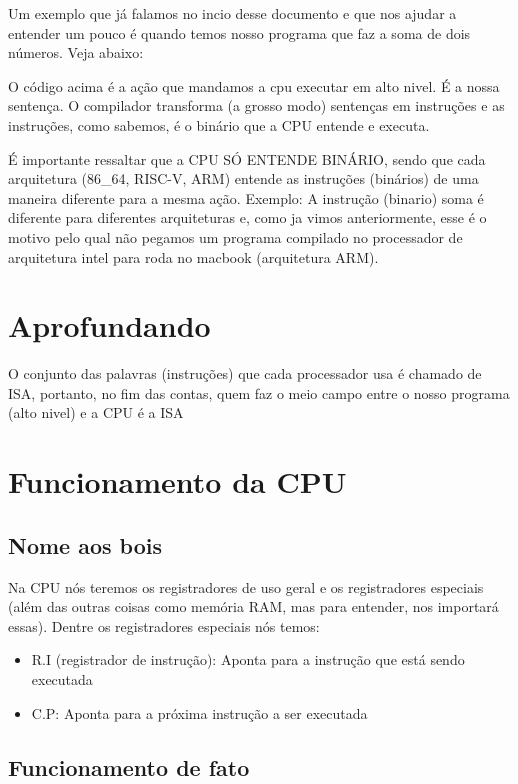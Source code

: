 \documentclass[12pt,a4paper]{report}
\begin{document}
	
	Um exemplo que já falamos no incio desse documento e que nos ajudar a entender um pouco é quando temos nosso programa que faz a soma de dois números. Veja abaixo:
	
	
	O código acima é a ação que mandamos a cpu executar em alto nivel. É a nossa sentença. O compilador transforma (a grosso modo) sentenças em instruções e as instruções, como sabemos, é o binário que a CPU entende e executa. 
	
	É importante ressaltar que a CPU SÓ ENTENDE BINÁRIO, sendo que cada arquitetura (86\_64, RISC-V, ARM) entende as instruções (binários) de uma maneira diferente para a mesma ação. Exemplo: A instrução (binario) soma é diferente para diferentes arquiteturas e, como ja vimos anteriormente, esse é o motivo pelo qual não pegamos um programa compilado no processador de arquitetura intel para roda no macbook (arquitetura ARM).
	
	\section{Aprofundando}
	O conjunto das palavras (instruções) que cada processador usa é chamado de ISA, portanto, no fim das contas, quem faz o meio campo entre o nosso programa (alto nivel) e a CPU é a ISA
	
	
	
	\section{Funcionamento da CPU}
	
	\subsection{Nome aos bois}
	
	Na CPU nós teremos os registradores de uso geral e os registradores especiais (além das outras coisas como memória RAM, mas para entender, nos importará essas). Dentre os registradores especiais nós temos:
	
	\begin{itemize}
		\item R.I (registrador de instrução): Aponta para a instrução que está sendo executada
		\item C.P: Aponta para a próxima instrução a ser executada 
	\end{itemize}
	
	\subsection{Funcionamento de fato}
	
\end{document}
